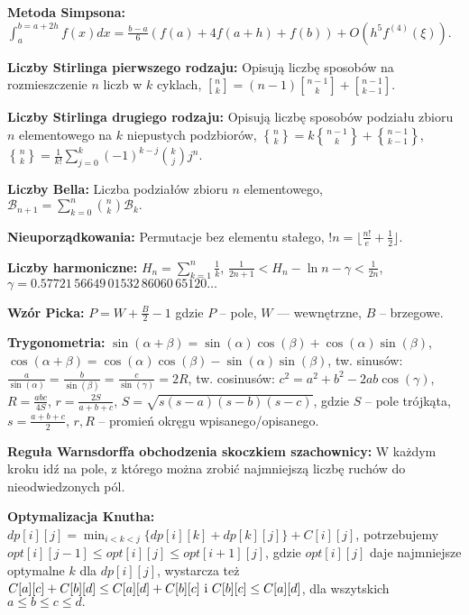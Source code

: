 \noindent
\textbf{Metoda Simpsona:} $\int_a^{b=a+2h} f(x)dx = \frac{b - a}{6}(f(a) + 4f(a + h) + f(b)) + O(h^5 f^{(4)}(\xi)).$

\newcommand{\stirlingfirst}[2]{\genfrac{[}{]}{0pt}{}{#1}{#2}}
\newcommand{\stirlingsecond}[2]{\genfrac{\{}{\}}{0pt}{}{#1}{#2}}
\newcommand{\norm}[1]{\lVert#1\rVert}

\noindent
\textbf{Liczby Stirlinga pierwszego rodzaju:} Opisują liczbę sposobów na rozmieszczenie $n$ liczb w $k$ cyklach, $\stirlingfirst{n}{k} = (n-1)\stirlingfirst{n-1}{k} + \stirlingfirst{n-1}{k-1}.$

\noindent
\textbf{Liczby Stirlinga drugiego rodzaju:} Opisują liczbę sposobów podziału zbioru $n$ elementowego na $k$ niepustych podzbiorów, $\stirlingsecond{n}{k} = k\stirlingsecond{n-1}{k} + \stirlingsecond{n-1}{k-1}$, $\stirlingsecond{n}{k} = \frac{1}{k!}\sum_{j=0}^k (-1)^{k-j} \binom{k}{j} j^n.$

\noindent
\textbf{Liczby Bella:} Liczba podziałów zbioru $n$ elementowego, $\mathcal{B}_{n+1} = \sum_{k=0}^n \binom{n}{k} \mathcal{B}_k.$

\noindent
\textbf{Nieuporządkowania:} Permutacje bez elementu stałego, $!n = \lfloor \frac{n!}{e} + \frac{1}{2} \rfloor.$

\noindent
\textbf{Liczby harmoniczne:} $H_n = \sum_{k = 1}^n \frac{1}{k}$,
$\frac{1}{2n+1} < H_n - \ln n - \gamma < \frac{1}{2n}$,\\ $\gamma = 0.57721\,56649\,01532\,86060\,65120\ldots$

\noindent
\textbf{Wzór Picka:} $P = W + \frac{B}{2} - 1$ gdzie $P$ -- pole, $W$ --- wewnętrzne, $B$ -- brzegowe.

\noindent
\textbf{Trygonometria:} $\sin(\alpha + \beta) = \sin(\alpha) \cos(\beta) + \cos(\alpha) \sin(\beta)$, $\cos(\alpha + \beta) = \cos(\alpha) \cos(\beta) - \sin(\alpha) \sin(\beta)$, tw. sinusów: $\frac{a}{\sin(\alpha)} = \frac{b}{\sin(\beta)} = \frac{c}{\sin(\gamma)} = 2R$, tw. cosinusów: $c^2 = a^2 + b^2 - 2ab\cos(\gamma)$, $R = \frac{abc}{4S}$, $r = \frac{2S}{a + b + c}$, $S = \sqrt{s(s-a)(s-b)(s-c)}$, gdzie $S$ -- pole trójkąta, $s = \frac{a+b+c}{2}$, $r, R$ -- promień okręgu wpisanego/opisanego.

\noindent
\textbf{Reguła Warnsdorffa obchodzenia skoczkiem szachownicy:} W każdym kroku idź na pole, z którego można zrobić najmniejszą liczbę ruchów do nieodwiedzonych pól.

\noindent
\textbf{Optymalizacja Knutha:} $dp[i][j] = \min_{i < k < j}\{dp[i][k] + dp[k][j]\} + C[i][j]$, potrzebujemy $opt[i][j - 1] \le opt[i][j] \le opt[i + 1][j]$, gdzie $opt[i][j]$ daje najmniejsze optymalne $k$ dla $dp[i][j]$, wystarcza też $C[a][c] + C[b][d] \le C[a][d] + C[b][c] \hbox{ i } C[b][c] \le C[a][d]$, dla wszytskich $a \le b \le c \le d.$

